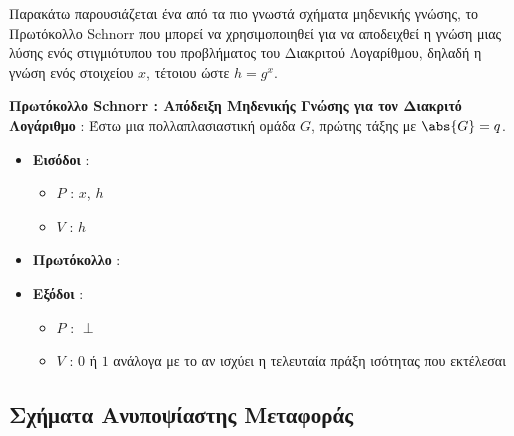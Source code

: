 Παρακάτω παρουσιάζεται ένα από τα πιο γνωστά σχήματα μηδενικής γνώσης, το Πρωτόκολλο Schnorr που μπορεί να χρησιμοποιηθεί για να αποδειχθεί η γνώση μιας λύσης ενός στιγμιότυπου του προβλήματος του Διακριτού Λογαρίθμου, δηλαδή η γνώση ενός στοιχείου $x$, τέτοιου ώστε $h=g^x$.

\begin{definition}
    \textbf{Πρωτόκολλο Schnorr : Απόδειξη Μηδενικής Γνώσης για τον Διακριτό Λογάριθμο} \cite{cramer1994proofs} :
    Έστω μια πολλαπλασιαστική ομάδα $G$, πρώτης τάξης με $\abs{G}=q$.
\begin{framed}
    \begin{itemize}
        \item \textbf{Εισόδοι} :
            \begin{itemize}
                \item $P$ : $x$, $h$
                \item $V$ : $h$
            \end{itemize}
        \item \textbf{Πρωτόκολλο} : 
        \item \textbf{Εξόδοι} :
            \begin{itemize}
                \item $P$ : $\perp$
                \item $V$ : $0$ ή $1$ ανάλογα με το αν ισχύει η τελευταία πράξη ισότητας που εκτέλεσαι
            \end{itemize}
    \end{itemize}
            \end{framed}
\end{definition}

\subsection{Σχήματα Ανυποψίαστης Μεταφοράς}


